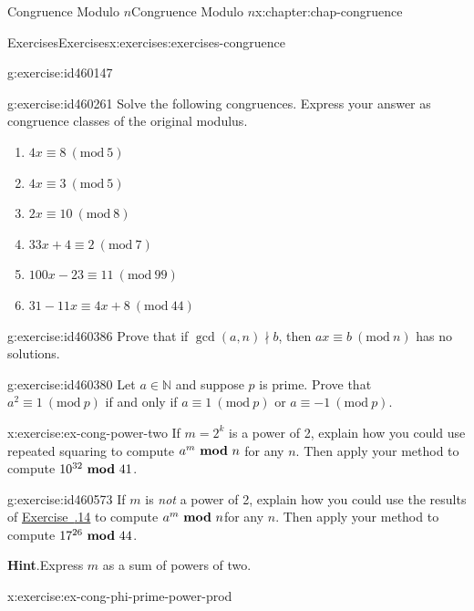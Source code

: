 \documentclass[oneside,10pt,]{book}
\newcommand{\blocktitlefont}{\relax}
\newcommand{\xreffont}{\relax}
\numberwithin{equation}{section}
\newcommand{\Mod}[1]{\ \left(\mathrm{mod}\ #1\right)}
\newcommand{\mmod}[1]{\ \mathrm{\bf mod}\ #1}
\begin{document}
\begin{chapterptx}{Congruence Modulo \(n\)}{}{Congruence Modulo \(n\)}{}{}{x:chapter:chap-congruence}
\begin{exercises-section}{Exercises}{}{Exercises}{}{}{x:exercises:exercises-congruence}
\begin{divisionexercise}{10}{}{}{g:exercise:id460147}
\begin{enumerate}[label=(\alph*)]
\end{enumerate}
%
\end{divisionexercise}%
\begin{divisionexercise}{11}{}{}{g:exercise:id460261}%
Solve the following congruences. Express your answer as congruence classes of the original modulus.%
\begin{enumerate}[label=(\alph*)]
\item{}\(\displaystyle 4x \equiv 8 \Mod{5}\)%
\item{}\(\displaystyle 4x \equiv 3 \Mod{5}\)%
\item{}\(\displaystyle 2x \equiv 10 \Mod{8}\)%
\item{}\(\displaystyle 33x + 4 \equiv 2 \Mod{7}\)%
\item{}\(\displaystyle 100x - 23 \equiv 11 \Mod{99}\)%
\item{}\(\displaystyle 31 - 11x \equiv 4x + 8 \Mod{44}\)%
\end{enumerate}
%
\end{divisionexercise}%
\begin{divisionexercise}{12}{}{}{g:exercise:id460386}%
Prove that if \(\gcd(a,n) \nmid b\), then \(ax \equiv b \Mod{n}\) has no solutions.%
\end{divisionexercise}%
\begin{divisionexercise}{13}{}{}{g:exercise:id460380}%
Let \(a \in \mathbb{N}\) and suppose \(p\) is prime. Prove that \(a^2 \equiv 1 \Mod{p}\) if and only if \(a \equiv 1 \Mod{p}\) or \(a \equiv -1 \Mod{p}\).%
\end{divisionexercise}%
\begin{divisionexercise}{14}{}{}{x:exercise:ex-cong-power-two}%
If \(m = 2^k\) is a power of 2, explain how you could use repeated squaring to compute \(a^m \mmod{n}\) for any \(n\). Then apply your method to compute \(10^{32} \mmod 41\).%
\end{divisionexercise}%
\begin{divisionexercise}{15}{}{}{g:exercise:id460573}%
If \(m\) is \emph{not} a power of 2, explain how you could use the results of \hyperlink{x:exercise:ex-cong-power-two}{Exercise~{\xreffont 4.6.14}} to compute \(a^m \mmod{n}\)for any \(n\). Then apply your method to compute \(17^{26} \mmod 44\).%
\par\smallskip%
\noindent\textbf{\blocktitlefont Hint}.\hypertarget{g:hint:id460684}{}\quad{}Express \(m\) as a sum of powers of two.%
\end{divisionexercise}%
\begin{divisionexercise}{16}{}{}{x:exercise:ex-cong-phi-prime-power-prod}%

\end{divisionexercise}
\end{exercises-section}
\end{chapterptx}
\end{document}

